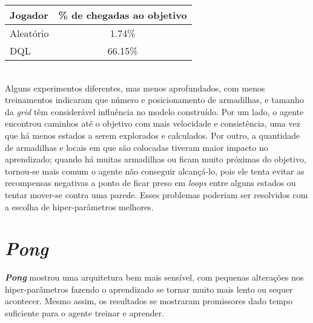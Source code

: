 \begin{center}
\begin{tabular}{l c}
\hline
Jogador & \% de chegadas ao objetivo \\
\hline
Aleatório & 1.74\% \\
DQL & 66.15\% \\
\hline
\end{tabular}
\label{table:gridworld_score}
\end{center}
\\

Alguns experimentos diferentes, mas menos aprofundados, com menos treinamentos indicaram que número e posicionamento de armadilhas, e tamanho da \textit{grid} têm considerável influência no modelo construído.
Por um lado, o agente encontrou caminhos até o objetivo com mais velocidade e consistência, uma vez que há menos estados a serem explorados e calculados.
Por outro, a quantidade de armadilhas e locais em que são colocadas tiveram maior impacto no aprendizado; quando há muitas armadilhas ou ficam muito próximas do objetivo, tornou-se mais comum o agente não conseguir alcançá-lo, pois ele tenta evitar as recompensas negativas a ponto de ficar preso em \textit{loops} entre alguns estados ou tentar mover-se contra uma parede.
Esses problemas poderiam ser resolvidos com a escolha de hiper-parâmetros melhores.

\section{\textit{Pong}}
\label{sec:res_pong}

\textbf{\textit{Pong}} mostrou uma arquitetura bem mais sensível, com pequenas alterações nos hiper-parâmetros fazendo o aprendizado se tornar muito mais lento ou sequer acontecer.
Mesmo assim, os resultados se mostraram promissores dado tempo suficiente para o agente treinar e aprender.


